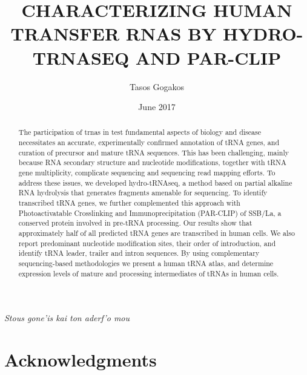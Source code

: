 \documentclass[12pt]{rockefeller}
\newcommand{\textgreek}[1]{\begingroup\fontencoding{LGR}\selectfont#1\endgroup} %
\begin{document}
\author{Tasos Gogakos}
\title{\MakeUppercase{Characterizing human transfer rnas by hydro-trnaseq and par-clip}}
\date{June 2017}

\maketitle

\thispagestyle{empty}
\makecopyright


\begin{abstract}

The participation of \glspl{trna} in \gls{test} fundamental aspects of biology and disease necessitates an accurate, experimentally confirmed annotation of tRNA genes, and curation of precursor and mature tRNA sequences. This has been challenging, mainly because RNA secondary structure and nucleotide modifications, together with tRNA gene multiplicity, complicate sequencing and sequencing read mapping efforts. To address these issues, we developed hydro-tRNAseq, a method based on partial alkaline RNA hydrolysis that generates fragments amenable for sequencing. To identify transcribed tRNA genes, we further complemented this approach with Photoactivatable Crosslinking and Immunoprecipitation (PAR-CLIP) of SSB/La, a conserved protein involved in pre-tRNA processing. Our results show that approximately half of all predicted tRNA genes are transcribed in human cells. We also report predominant nucleotide modification sites, their order of introduction, and identify tRNA leader, trailer and intron sequences. By using complementary sequencing-based methodologies we present a human tRNA atlas, and determine expression levels of mature and processing intermediates of tRNAs in human cells.
\end{abstract}


\chapter*{} %
\addtocounter{page}{2} %
\vspace{3in} %
\begin{flushright} %
\emph{\textgreek{Stous gone'is kai ton aderf'o mou}}
\end{flushright}

\chapter*{Acknowledgments} %
\end{document}
